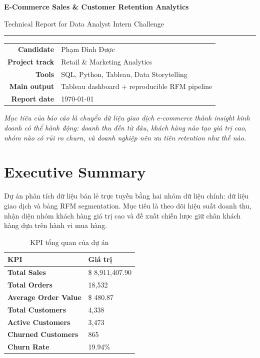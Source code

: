 \documentclass[11pt,a4paper]{article}
\newcommand{\kpi}[2]{\textbf{#1} & #2 \\}
\begin{document}
\begin{titlepage}
\pagecolor{softgreen}
\centering
\vspace*{1.5cm}
{\sffamily\bfseries\Huge\color{brandgreen} E-Commerce Sales \& Customer Retention Analytics\par}
\vspace{0.4cm}
{\sffamily\Large Technical Report for Data Analyst Intern Challenge\par}
\vspace{1.2cm}
\rule{0.78\textwidth}{1pt}
\vspace{1.0cm}

\begin{tabular}{rl}
\textbf{Candidate} & Phạm Đình Được \\
\textbf{Project track} & Retail \& Marketing Analytics \\
\textbf{Tools} & SQL, Python, Tableau, Data Storytelling \\
\textbf{Main output} & Tableau dashboard + reproducible RFM pipeline \\
\textbf{Report date} & \today \\
\end{tabular}

\vfill
\begin{minipage}{0.82\textwidth}
\centering
\textit{Mục tiêu của báo cáo là chuyển dữ liệu giao dịch e-commerce thành insight kinh doanh có thể hành động: doanh thu đến từ đâu, khách hàng nào tạo giá trị cao, nhóm nào có rủi ro churn, và doanh nghiệp nên ưu tiên retention như thế nào.}
\end{minipage}
\vfill
\end{titlepage}
\nopagecolor

\tableofcontents
\newpage

\section{Executive Summary}

Dự án phân tích dữ liệu bán lẻ trực tuyến bằng hai nhóm dữ liệu chính: dữ liệu giao dịch và bảng RFM segmentation. Mục tiêu là theo dõi hiệu suất doanh thu, nhận diện nhóm khách hàng giá trị cao và đề xuất chiến lược giữ chân khách hàng dựa trên hành vi mua hàng.

\begin{table}[H]
\centering
\caption{KPI tổng quan của dự án}
\begin{tabular}{ll}
\toprule
\textbf{KPI} & \textbf{Giá trị} \\
\midrule
\kpi{Total Sales}{\$ 8,911,407.90}
\kpi{Total Orders}{18,532}
\kpi{Average Order Value}{\$ 480.87}
\kpi{Total Customers}{4,338}
\kpi{Active Customers}{3,473}
\kpi{Churned Customers}{865}
\kpi{Churn Rate}{19.94\%}
\bottomrule
\end{tabular}
\end{table}
\end{document}
